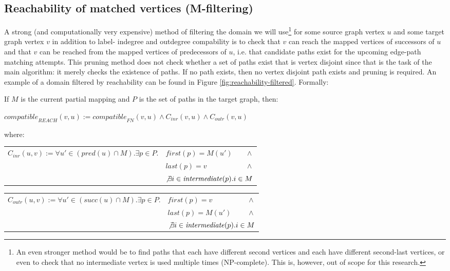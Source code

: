 \subsection{Reachability of matched vertices (M-filtering)}
A strong (and computationally very expensive) method of filtering the domain we will use\footnote{An even stronger method would be to find paths that each have different second vertices and each have different second-last vertices, or even to check that no intermediate vertex is used multiple times (NP-complete). This is, however, out of scope for this research.} for some source graph vertex $u$ and some target graph vertex $v$ in addition to label- indegree and outdegree compability is to check that $v$ can reach the mapped vertices of successors of $u$ and that $v$ can be reached from the mapped vertices of predecessors of $u$, i.e. that candidate paths exist for the upcoming edge-path matching attempts. This pruning method does not check whether a set of paths exist that is vertex disjoint since that is the task of the main algorithm: it merely checks the existence of paths. If no path exists, then no vertex disjoint path exists and pruning is required. An example of a domain filtered by reachability can be found in Figure \ref{fig:reachability-filtered}. Formally:


\begin{minipage}{\textwidth}
\begin{defn}

If $M$ is the current partial mapping and $P$ is the set of paths in the target graph, then:

$\mathit{compatible}_{\mathit{REACH}}(v,u) := \mathit{compatible}_{\mathit{FN}}(v,u) \land C_{\mathit{inr}}(v, u) \land C_{\mathit{outr}}(v, u)$

where:

\begin{tabular}{lll}
$C_{\mathit{inr}}(u, v) := \forall u' \in (\mathit{pred}(u) \cap M) .  \exists p \in P .$&$\mathit{first}(p)=M(u')$&$\land$\\
&$\mathit{last}(p)=v$&$\land$\\
&\multicolumn{2}{l}{$\not \exists i \in \mathit{intermediate}(p) . i \in M$}
\end{tabular}

\begin{tabular}{lll}
$C_{\mathit{outr}}(u, v) := \forall u' \in (\mathit{succ}(u) \cap M) .  \exists p \in P .$&$\mathit{first}(p)=v$&$\land$\\
&$\mathit{last}(p)=M(u')$&$\land$\\
&\multicolumn{2}{l}{$\not \exists i \in \mathit{intermediate}(p) . i \in M$}
\end{tabular}
\end{defn}
\end{minipage}



